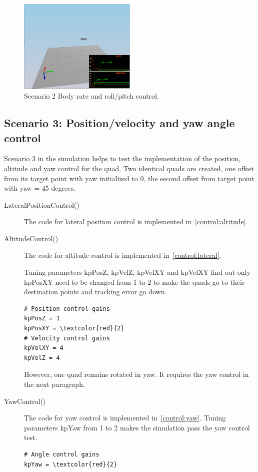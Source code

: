 \documentclass[letterpaper]{article}
\begin{document}
\begin{figure}[ht]
\centering
\includegraphics[width=0.5\textwidth]{./fig/scenario2.png}
\caption{\label{fig:scenario2} Scenario 2 Body rate and roll/pitch control.}
\end{figure}

\subsection{Scenario 3: Position/velocity and yaw angle control}

Scenario 3 in the simulation helps to test the implementation of the position, altitude and yaw control for the quad. Two identical quads are created, one offset from its target point with yaw initialized to 0, the second offset from target point with yaw = 45 degrees.

\begin{description}
\item [LateralPositionControl()] The code for lateral position  control is implemented in~\ref{control:altitude}. 

\item [AltitudeControl()] The code for altitude control is implemented in~\ref{control:lateral}. 

Tuning parameters kpPosZ, kpVelZ, kpVelXY and kpVelXY find out only kpPosXY need to be changed from 1 to 2 to make the quads go to their destination points and tracking error go down. 

\begin{Verbatim}[frame=single,commandchars=\\\{\}]
# Position control gains
kpPosZ = 1
kpPosXY = \textcolor{red}{2}
# Velocity control gains
kpVelXY = 4
kpVelZ = 4
\end{Verbatim} 

However, one quad remains rotated in yaw. It requires the yaw control in the next paragraph. 

\item [YawControl()] The code for yaw control is implemented in~\ref{control:yaw}. Tuning parameters kpYaw from 1 to 2 makes the simulation pass the yaw control test.

\begin{Verbatim}[frame=single,commandchars=\\\{\}]
# Angle control gains
kpYaw = \textcolor{red}{2}
\end{Verbatim} 

\end{description}
\end{document}
